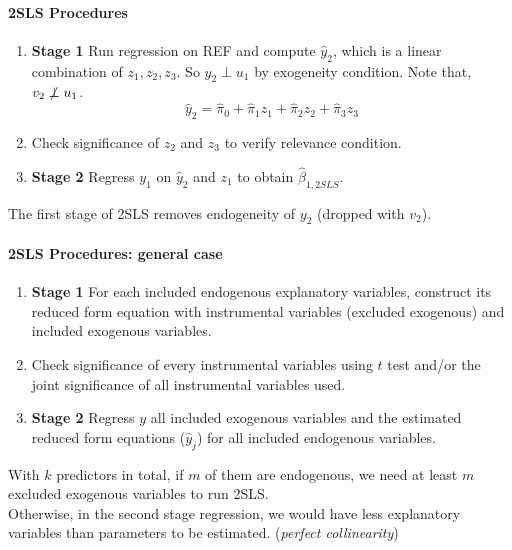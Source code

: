 \documentclass[]{article}
\begin{document}
		\paragraph{2SLS Procedures}
		\begin{enumerate}
			\item \textbf{Stage 1} Run regression on REF and compute $\hat{y}_2$, which is a linear combination of $z_1, z_2, z_3$. So $\hat{y}_2 \perp u_1$ by exogeneity condition. Note that, $v_2 \centernot \perp u_1$.
			\[
				\hat{y}_2 = \hat{\pi}_0 + \hat{\pi}_1 z_1 + \hat{\pi}_2 z_2 + \hat{\pi}_3 z_3
			\]
			\item Check significance of $z_2$ and $z_3$ to verify relevance condition. 
			\item \textbf{Stage 2} Regress $y_1$ on $\hat{y}_2$ and $z_1$ to obtain $\hat{\beta}_{1, 2SLS}$.
		\end{enumerate}
		
		\begin{remark}
			The first stage of 2SLS removes endogeneity of $y_2$ (dropped with $v_2$).
		\end{remark}

		\paragraph{2SLS Procedures: general case}
		\begin{enumerate}
			\item \textbf{Stage 1} For each included endogenous explanatory variables, construct its reduced form equation with instrumental variables (excluded exogenous) and included exogenous variables.
			\item Check significance of every instrumental variables using $t$ test and/or the joint significance of all instrumental variables used.
			\item \textbf{Stage 2} Regress $y$ all included exogenous variables and the estimated reduced form equations ($\hat{y}_j$) for all included endogenous variables.
		\end{enumerate}		

		\begin{remark}
			With $k$ predictors in total, if $m$ of them are endogenous, we need at least $m$ excluded exogenous variables to run 2SLS.\\
			Otherwise, in the second stage regression, we would have less explanatory variables than parameters to be estimated. (\emph{perfect collinearity})
		\end{remark}
		
\end{document}
